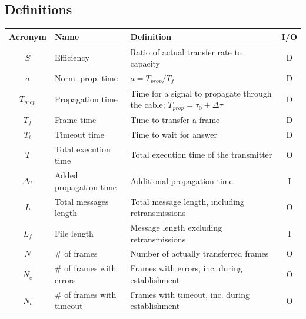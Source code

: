 \documentclass[a4paper, 11pt]{report}
\begin{document}
\subsection{Definitions}

\begin{center}
	\small
	\begin{tabular}{c | l | p{81mm} | c}
		\hline \hline
		\textbf{Acronym} & \textbf{Name}             & \textbf{Definition}                                                                & I/O \\ \hline
		$S$              & Efficiency                & Ratio of actual transfer rate to capacity                                          & D   \\
		$a$              & Norm. prop. time          & $a = T_{prop}/T_f$                                                                 & D   \\
		$T_{prop}$       & Propagation time          & Time for a signal to propagate through the cable; $T_{prop} = \tau_0 + \Delta\tau$ & D   \\
		$T_f$            & Frame time                & Time to transfer a frame                                                           & D   \\
		$T_t$            & Timeout time              & Time to wait for answer                                                            & D   \\
		$T$              & Total execution time      & Total execution time of the transmitter                                            & O   \\
		$\Delta\tau$     & Added propagation time    & Additional propagation time                                                        & I   \\
		$L$              & Total messages length     & Total message length, including retransmissions                                    & O   \\
		$L_f$            & File length               & Message length excluding retransmissions                                           & I   \\
		$N$				 & \# of frames              & Number of actually transferred frames                                              & O   \\
		$N_e$            & \# of frames with errors  & Frames with errors, inc. during establishment                                      & O   \\
		$N_t$            & \# of frames with timeout & Frames with timeout, inc. during establishment                                     & O   \\

\end{tabular}
\end{center}
\end{document}
